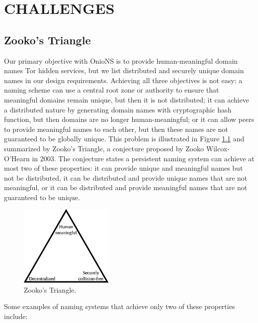 
\chapter{CHALLENGES}

\section{Zooko's Triangle}
\label{sec:ZookosTriangle}

Our primary objective with OnioNS is to provide human-meaningful domain names Tor hidden services, but we list distributed and securely unique domain names in our design requirements. Achieving all three objectives is not easy; a naming scheme can use a central root zone or authority to ensure that meaningful domains remain unique, but then it is not distributed; it can achieve a distributed nature by generating domain names with cryptographic hash function, but then domains are no longer human-meaningful; or it can allow peers to provide meaningful names to each other, but then these names are not guaranteed to be globally unique. This problem is illustrated in Figure \ref{fig:ZookosTriangle} and summarized by Zooko's Triangle, a conjecture proposed by Zooko Wilcox-O'Hearn in 2003. The conjecture states a persistent naming system can achieve at most two of these properties: it can provide unique and meaningful names but not be distributed, it can be distributed and provide unique names that are not meaningful, or it can be distributed and provide meaningful names that are not guaranteed to be unique.\cite{ferdous2009security}\cite{stiegler2005petname}

\begin{figure}[htbp]
	\centering
	\includegraphics[width=0.4\textwidth]{images/Zooko.eps}
	\caption{Zooko's Triangle.}
	\label{fig:ZookosTriangle}
\end{figure}

Some examples of naming systems that achieve only two of these properties include:

